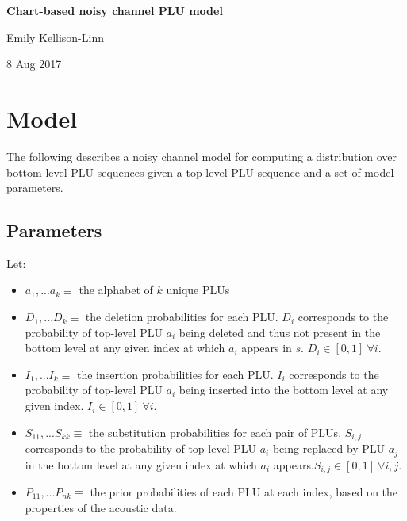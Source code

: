 \documentclass[11pt]{article}
\begin{document}
\begin{center}
	
	{\Large \textbf{Chart-based noisy channel PLU model}}

	{\normalsize Emily Kellison-Linn}
		
	{\footnotesize 8 Aug 2017}
	
\end{center}

\section{Model}

The following describes a noisy channel model for computing a distribution over bottom-level PLU sequences given a top-level PLU sequence and a set of model parameters.

\subsection{Parameters}

Let:

\begin{itemize}

\item $a_1, ... a_k \equiv$ the alphabet of $k$ unique PLUs

\item $D_1, ... D_k \equiv$ the deletion probabilities for each PLU. $D_i$ corresponds to the probability of top-level PLU $a_i$ being deleted and thus not present in the bottom level at any given index at which $a_i$ appears in $s$. $D_i\in [0,1]~\forall i$. 

\item $I_1, ... I_k \equiv$ the insertion probabilities for each PLU. $I_i$ corresponds to the probability of top-level PLU $a_i$ being inserted into the bottom level at any given index. $I_i\in [0,1]~\forall i$.

\item $S_{11}, ... S_{kk} \equiv$ the substitution probabilities for each pair of PLUs. $S_{i,j}$ corresponds to the probability of top-level PLU $a_i$ being replaced by PLU $a_j$ in the bottom level at any given index at which $a_i$ appears.$S_{i,j}\in [0,1]~\forall i,j$.

\item $P_{11}, ... P_{nk} \equiv$ the prior probabilities of each PLU at each index, based on the properties of the acoustic data.

\end{itemize}
\end{document}
